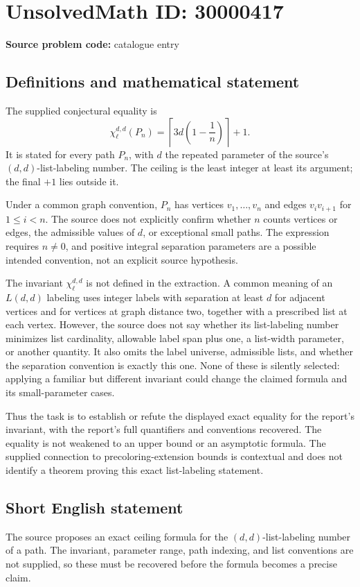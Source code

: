 \documentclass[11pt]{article}
\begin{document}
\section*{UnsolvedMath ID: 30000417}
\textbf{Source problem code:} catalogue entry
\subsection{Definitions and mathematical statement}
The supplied conjectural equality is
\[
 \chi^{d,d}_{\ell}(P_n)
   =\left\lceil3d\left(1-\frac1n\right)\right\rceil+1.
\]
It is stated for every path $P_n$, with $d$ the repeated parameter of the source's $(d,d)$-list-labeling number. The ceiling is the least integer at least its argument; the final $+1$ lies outside it.

Under a common graph convention, $P_n$ has vertices $v_1,\ldots,v_n$ and edges $v_iv_{i+1}$ for $1\le i<n$. The source does not explicitly confirm whether $n$ counts vertices or edges, the admissible values of $d$, or exceptional small paths. The expression requires $n\ne0$, and positive integral separation parameters are a possible intended convention, not an explicit source hypothesis.

The invariant $\chi^{d,d}_{\ell}$ is not defined in the extraction. A common meaning of an $L(d,d)$ labeling uses integer labels with separation at least $d$ for adjacent vertices and for vertices at graph distance two, together with a prescribed list at each vertex. However, the source does not say whether its list-labeling number minimizes list cardinality, allowable label span plus one, a list-width parameter, or another quantity. It also omits the label universe, admissible lists, and whether the separation convention is exactly this one. None of these is silently selected: applying a familiar but different invariant could change the claimed formula and its small-parameter cases.

Thus the task is to establish or refute the displayed exact equality for the report's invariant, with the report's full quantifiers and conventions recovered. The equality is not weakened to an upper bound or an asymptotic formula. The supplied connection to precoloring-extension bounds is contextual and does not identify a theorem proving this exact list-labeling statement.
\subsection{Short English statement}
The source proposes an exact ceiling formula for the $(d,d)$-list-labeling number of a path. The invariant, parameter range, path indexing, and list conventions are not supplied, so these must be recovered before the formula becomes a precise claim.
\end{document}
